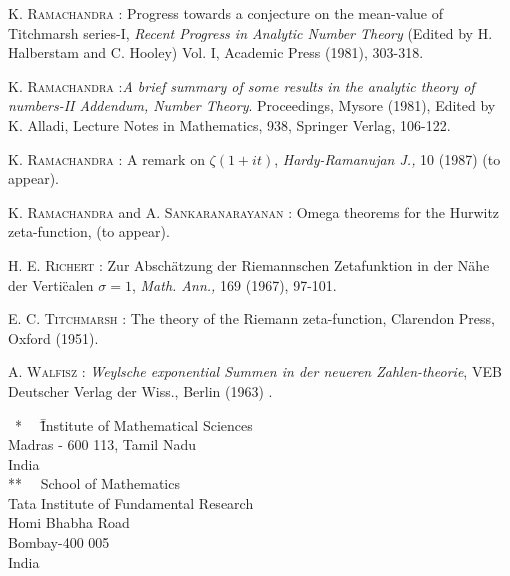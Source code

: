 \begin{thebibliography}{99}
 \textsc{K. Ramachandra} : Progress towards a conjecture on the mean-value of Titchmarsh series-I, \textit{Recent Progress in Analytic Number Theory} (Edited by H. Halberstam and C. Hooley) Vol. I, Academic Press (1981), 303-318.

 \textsc{K. Ramachandra} :\pageoriginale \textit{A brief summary of some results in the analytic theory of numbers-II Addendum, Number Theory}. Proceedings, Mysore (1981), Edited by K. Alladi, Lecture Notes in Mathematics, 938, Springer Verlag, 106-122.

 \textsc{K. Ramachandra} : A remark on $\zeta(1+ it)$, \textit{Hardy-Ramanujan J.,} 10 (1987) (to appear).

 \textsc{K. Ramachandra}  and \textsc{A. Sankaranarayanan} : Omega theorems for the Hurwitz zeta-function, (to appear).

 \textsc{H. E. Richert} : Zur Absch\"atzung der Riemannschen Zetafunktion in der N\"ahe der Verti\"calen $\sigma =1$, \textit{Math. Ann.,} 169 (1967), 97-101.

 \textsc{E. C. Titchmarsh} : The theory of the Riemann zeta-function, Clarendon Press, Oxford (1951).

 \textsc{A. Walfisz} : \textit{Weylsche exponential Summen in der neueren Zahlen-theorie}, VEB Deutscher Verlag der Wiss., Berlin (1963) .
\end{thebibliography}

\begin{tabbing}
~*~~ \= \= {\small Institute of Mathematical Sciences}\\
\> \> {\small Madras - 600 113, Tamil Nadu} \\
\> \> {\small India} \\
**~~ \> \> {\small School of Mathematics}\\
\> \> {\small Tata Institute of Fundamental Research}\\
\> \> {\small Homi Bhabha Road} \\
\> \> {\small Bombay-400 005}\\
\> \> {\small India}
\end{tabbing}




